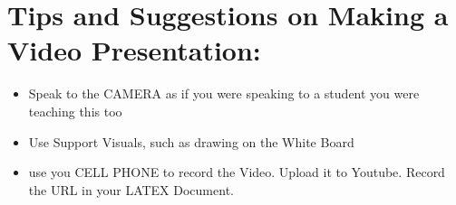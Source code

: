 \section{Tips and Suggestions on Making a Video Presentation:}

\begin{itemize}
    \item Speak to the CAMERA as if you were speaking to a student you were teaching this too
    \item Use Support Visuals, such as drawing on the White Board
    \item use you CELL PHONE to record the Video. Upload it to Youtube. Record the URL in your LATEX Document.
\end{itemize}